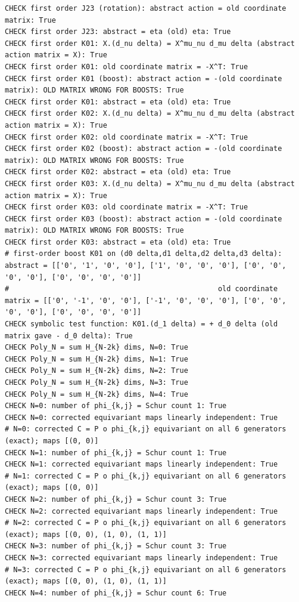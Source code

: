 \documentclass{article}
\theoremstyle{remark}
\begin{document}
\begin{lstlisting}
CHECK first order J23 (rotation): abstract action = old coordinate matrix: True
CHECK first order J23: abstract = eta (old) eta: True
CHECK first order K01: X.(d_nu delta) = X^mu_nu d_mu delta (abstract action matrix = X): True
CHECK first order K01: old coordinate matrix = -X^T: True
CHECK first order K01 (boost): abstract action = -(old coordinate matrix): OLD MATRIX WRONG FOR BOOSTS: True
CHECK first order K01: abstract = eta (old) eta: True
CHECK first order K02: X.(d_nu delta) = X^mu_nu d_mu delta (abstract action matrix = X): True
CHECK first order K02: old coordinate matrix = -X^T: True
CHECK first order K02 (boost): abstract action = -(old coordinate matrix): OLD MATRIX WRONG FOR BOOSTS: True
CHECK first order K02: abstract = eta (old) eta: True
CHECK first order K03: X.(d_nu delta) = X^mu_nu d_mu delta (abstract action matrix = X): True
CHECK first order K03: old coordinate matrix = -X^T: True
CHECK first order K03 (boost): abstract action = -(old coordinate matrix): OLD MATRIX WRONG FOR BOOSTS: True
CHECK first order K03: abstract = eta (old) eta: True
# first-order boost K01 on (d0 delta,d1 delta,d2 delta,d3 delta): abstract = [['0', '1', '0', '0'], ['1', '0', '0', '0'], ['0', '0', '0', '0'], ['0', '0', '0', '0']]
#                                                 old coordinate matrix = [['0', '-1', '0', '0'], ['-1', '0', '0', '0'], ['0', '0', '0', '0'], ['0', '0', '0', '0']]
CHECK symbolic test function: K01.(d_1 delta) = + d_0 delta (old matrix gave - d_0 delta): True
CHECK Poly_N = sum H_{N-2k} dims, N=0: True
CHECK Poly_N = sum H_{N-2k} dims, N=1: True
CHECK Poly_N = sum H_{N-2k} dims, N=2: True
CHECK Poly_N = sum H_{N-2k} dims, N=3: True
CHECK Poly_N = sum H_{N-2k} dims, N=4: True
CHECK N=0: number of phi_{k,j} = Schur count 1: True
CHECK N=0: corrected equivariant maps linearly independent: True
# N=0: corrected C = P o phi_{k,j} equivariant on all 6 generators (exact); maps [(0, 0)]
CHECK N=1: number of phi_{k,j} = Schur count 1: True
CHECK N=1: corrected equivariant maps linearly independent: True
# N=1: corrected C = P o phi_{k,j} equivariant on all 6 generators (exact); maps [(0, 0)]
CHECK N=2: number of phi_{k,j} = Schur count 3: True
CHECK N=2: corrected equivariant maps linearly independent: True
# N=2: corrected C = P o phi_{k,j} equivariant on all 6 generators (exact); maps [(0, 0), (1, 0), (1, 1)]
CHECK N=3: number of phi_{k,j} = Schur count 3: True
CHECK N=3: corrected equivariant maps linearly independent: True
# N=3: corrected C = P o phi_{k,j} equivariant on all 6 generators (exact); maps [(0, 0), (1, 0), (1, 1)]
CHECK N=4: number of phi_{k,j} = Schur count 6: True

\end{lstlisting}
\end{document}
